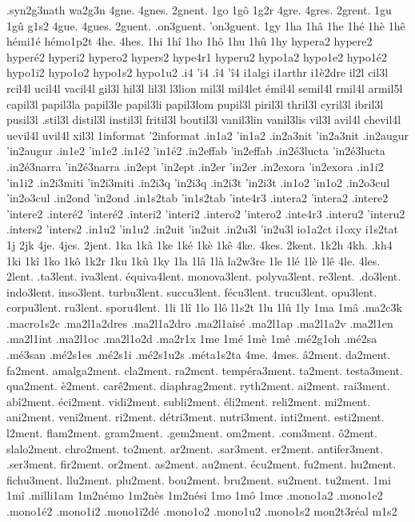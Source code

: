 .syn2g3nath
wa2g3n
4gne.
4gnes.
2gnent.
1go
1gô
1g2r
4gre.
4gres.
2grent.
1gu
1gû
g1s2
4gue.
4gues.
2guent.
.on3guent.
'on3guent.
1gy
1ha
1hâ
1he
1hé
1hè
1hê
hémi1é
hémo1p2t
4he.
4hes.
1hi
1hî
1ho
1hô
1hu
1hû
1hy
hypera2
hypere2
hyperé2
hyperi2
hypero2
hypers2
hype4r1
hyperu2
hypo1a2
hypo1e2
hypo1é2
hypo1i2
hypo1o2
hypo1s2
hypo1u2
.i4
'i4
.î4
'î4
i1algi
i1arthr
i1è2dre
il2l
cil3l
rcil4l
ucil4l
vacil4l
gil3l
hil3l
lil3l
l3lion
mil3l
mil4let
émil4l
semil4l
rmil4l
armil5l
capil3l
papil3la
papil3le
papil3li
papil3lom
pupil3l
piril3l
thril3l
cyril3l
ibril3l
pusil3l
.stil3l
distil3l
instil3l
fritil3l
boutil3l
vanil3lin
vanil3lis
vil3l
avil4l
chevil4l
uevil4l
uvil4l
xil3l
1informat
'2informat
.in1a2
'in1a2
.in2a3nit
'in2a3nit
.in2augur
'in2augur
.in1e2
'in1e2
.in1é2
'in1é2
.in2effab
'in2effab
.in2é3lucta
'in2é3lucta
.in2é3narra
'in2é3narra
.in2ept
'in2ept
.in2er
'in2er
.in2exora
'in2exora
.in1i2
'in1i2
.in2i3miti
'in2i3miti
.in2i3q
'in2i3q
.in2i3t
'in2i3t
.in1o2
'in1o2
.in2o3cul
'in2o3cul
.in2ond
'in2ond
.in1s2tab
'in1s2tab
'inte4r3
.intera2
'intera2
.intere2
'intere2
.interé2
'interé2
.interi2
'interi2
.intero2
'intero2
.inte4r3
.interu2
'interu2
.inters2
'inters2
.in1u2
'in1u2
.in2uit
'in2uit
.in2u3l
'in2u3l
io1a2ct
i1oxy
i1s2tat
1j
2jk
4je.
4jes.
2jent.
1ka
1kâ
1ke
1ké
1kè
1kê
4ke.
4kes.
2kent.
1k2h
4kh.
.kh4
1ki
1kî
1ko
1kô
1k2r
1ku
1kû
1ky
1la
1lâ
1là
la2w3re
1le
1lé
1lè
1lê
4le.
4les.
2lent.
.ta3lent.
iva3lent.
équiva4lent.
monova3lent.
polyva3lent.
re3lent.
.do3lent.
indo3lent.
inso3lent.
turbu3lent.
succu3lent.
fécu3lent.
trucu3lent.
opu3lent.
corpu3lent.
ru3lent.
sporu4lent.
1li
1lî
1lo
1lô
l1s2t
1lu
1lû
1ly
1ma
1mâ
.ma2c3k
.macro1s2c
.ma2l1a2dres
.ma2l1a2dro
.ma2l1aisé
.ma2l1ap
.ma2l1a2v
.ma2l1en
.ma2l1int
.ma2l1oc
.ma2l1o2d
.ma2r1x
1me
1mé
1mè
1mê
.mé2g1oh
.mé2sa
.mé3san
.mé2s1es
.mé2s1i
.mé2s1u2s
.méta1s2ta
4me.
4mes.
â2ment.
da2ment.
fa2ment.
amalga2ment.
cla2ment.
ra2ment.
tempéra3ment.
ta2ment.
testa3ment.
qua2ment.
è2ment.
carê2ment.
diaphrag2ment.
ryth2ment.
ai2ment.
rai3ment.
abî2ment.
éci2ment.
vidi2ment.
subli2ment.
éli2ment.
reli2ment.
mi2ment.
ani2ment.
veni2ment.
ri2ment.
détri3ment.
nutri3ment.
inti2ment.
esti2ment.
l2ment.
flam2ment.
gram2ment.
.gem2ment.
om2ment.
.com3ment.
ô2ment.
slalo2ment.
chro2ment.
to2ment.
ar2ment.
.sar3ment.
er2ment.
antifer3ment.
.ser3ment.
fir2ment.
or2ment.
as2ment.
au2ment.
écu2ment.
fu2ment.
hu2ment.
fichu3ment.
llu2ment.
plu2ment.
bou2ment.
bru2ment.
su2ment.
tu2ment.
1mi
1mî
.milli1am
1m2némo
1m2nès
1m2nési
1mo
1mô
1mœ
.mono1a2
.mono1e2
.mono1é2
.mono1i2
.mono1ï2dé
.mono1o2
.mono1u2
.mono1s2
mon2t3réal
m1s2
